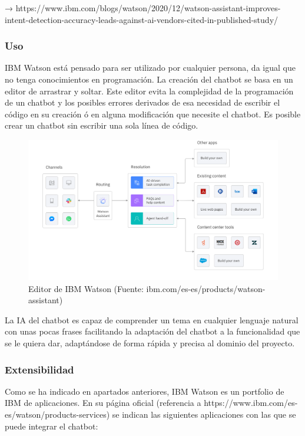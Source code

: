 → https://www.ibm.com/blogs/watson/2020/12/watson-assistant-improves-intent-detection-accuracy-leads-against-ai-vendors-cited-in-published-study/

\subsubsection*{Uso}

IBM Watson está pensado para ser utilizado por cualquier persona, da igual que no tenga conocimientos en programación. La creación del chatbot se basa en un editor de arrastrar y soltar. Este editor evita la complejidad de la programación de un chatbot y los posibles errores derivados de esa necesidad de escribir el código en su creación ó en alguna modificación que necesite el chatbot. Es posible crear un chatbot sin escribir una sola línea de código.

\begin{figure}[h]
    \centering
    \includegraphics[width=1.0\textwidth]{imagenes/04_Analisis/editor_IBM_Watson.png}
    \caption{Editor de IBM Watson (Fuente: ibm.com/es-es/products/watson-assistant)}
\end{figure}

La IA del chatbot es capaz de comprender un tema en cualquier lenguaje natural con unas pocas frases facilitando la adaptación del chatbot a la funcionalidad que se le quiera dar, adaptándose de forma rápida y precisa al dominio del proyecto.

\subsubsection*{Extensibilidad}

Como se ha indicado en apartados anteriores, IBM Watson es un portfolio de IBM de aplicaciones. En su página oficial (referencia a https://www.ibm.com/es-es/watson/products-services) se indican las siguientes aplicaciones con las que se puede integrar el chatbot:

